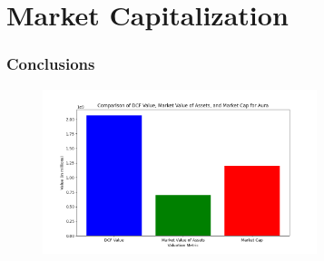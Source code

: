 \documentclass{beamer}%
\begin{document}
%
\section{Market Capitalization}%
\label{sec:MarketCapitalization}%
\begin{frame}%
\frametitle{Conclusions}%


\begin{figure}[h!]%
\centering%
\includegraphics[width=80mm]{valuation_comparison.png}%
\end{figure}

%
\end{frame}

%
\end{document}
